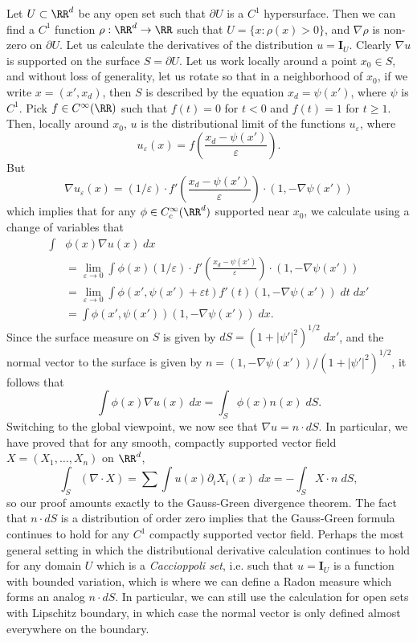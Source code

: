 \begin{example}
    Let $U \subset \RR^d$ be any open set such that $\partial U$ is a $C^1$ hypersurface. Then we can find a $C^1$ function $\rho: \RR^d \to \RR$ such that $U = \{ x : \rho(x) > 0 \}$, and $\nabla \rho$ is non-zero on $\partial U$. Let us calculate the derivatives of the distribution $u = \mathbf{I}_U$. Clearly $\nabla u$ is supported on the surface $S = \partial U$. Let us work locally around a point $x_0 \in S$, and without loss of generality, let us rotate so that in a neighborhood of $x_0$, if we write $x = (x',x_d)$, then $S$ is described by the equation $x_d = \psi(x')$, where $\psi$ is $C^1$. Pick $f \in C^\infty(\RR)$ such that $f(t) = 0$ for $t < 0$ and $f(t) = 1$ for $t \geq 1$. Then, locally around $x_0$, $u$ is the distributional limit of the functions $u_\varepsilon$, where
    \[ u_\varepsilon(x) = f \left( \frac{x_d - \psi(x')}{\varepsilon} \right). \]
    But
    \[ \nabla u_\varepsilon(x) = (1/\varepsilon) \cdot f' \left( \frac{x_d - \psi(x')}{\varepsilon} \right) \cdot \left( 1, - \nabla \psi(x') \right) \]
    which implies that for any $\phi \in C_c^\infty(\RR^d)$ supported near $x_0$, we calculate using a change of variables that
    \begin{align*}
        \int &\phi(x) \nabla u(x)\; dx\\
        &= \lim_{\varepsilon \to 0} \int \phi(x) (1/\varepsilon) \cdot f' \left( \frac{x_d - \psi(x')}{\varepsilon} \right) \cdot \left( 1, - \nabla \psi(x') \right)\\
        &= \lim_{\varepsilon \to 0} \int \phi(x', \psi(x') + \varepsilon t) f'(t) (1, -\nabla \psi(x'))\; dt\; dx'\\
        &= \int \phi(x', \psi(x')) (1, -\nabla \psi(x'))\; dx.
    \end{align*}
    Since the surface measure on $S$ is given by $dS = (1 + |\psi'|^2)^{1/2}\; dx'$, and the normal vector to the surface is given by $n = (1, -\nabla \psi(x')) / (1 + |\psi'|^2)^{1/2}$, it follows that
    \[ \int \phi(x) \nabla u(x)\; dx = \int_S \phi(x) n(x)\; dS. \]
    Switching to the global viewpoint, we now see that $\nabla u = n \cdot dS$. In particular, we have proved that for any smooth, compactly supported vector field $X = (X_1,\dots,X_n)$ on $\RR^d$,
    \[ \int_S (\nabla \cdot X) = \sum \int u(x) \partial_i X_i(x)\; dx = - \int_S X \cdot n\; dS, \]
    so our proof amounts exactly to the Gauss-Green divergence theorem. The fact that $n \cdot dS$ is a distribution of order zero implies that the Gauss-Green formula continues to hold for any $C^1$ compactly supported vector field. Perhaps the most general setting in which the distributional derivative calculation continues to hold for any domain $U$ which is a \emph{Caccioppoli set}, i.e. such that $u = \mathbf{I}_U$ is a function with bounded variation, which is where we can define a Radon measure which forms an analog $n \cdot dS$. In particular, we can still use the calculation for open sets with Lipschitz boundary, in which case the normal vector is only defined almost everywhere on the boundary.    
\end{example}


